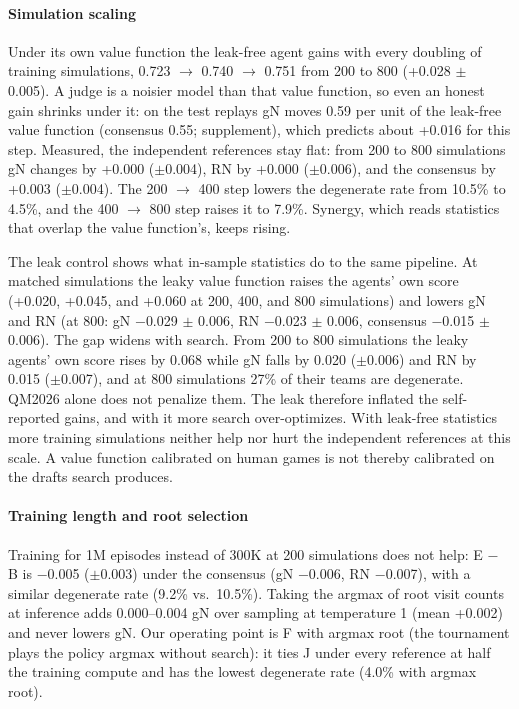 \documentclass[journal]{IEEEtran}
\begin{document}
\paragraph{Simulation scaling} Under its own value function the leak-free agent gains with every doubling of training simulations, 0.723 $\to$ 0.740 $\to$ 0.751 from 200 to 800 (+0.028 $\pm$ 0.005). A judge is a noisier model than that value function, so even an honest gain shrinks under it: on the test replays gN moves 0.59 per unit of the leak-free value function (consensus 0.55; supplement), which predicts about +0.016 for this step. Measured, the independent references stay flat: from 200 to 800 simulations gN changes by +0.000 ($\pm$0.004), RN by +0.000 ($\pm$0.006), and the consensus by +0.003 ($\pm$0.004). The 200 $\to$ 400 step lowers the degenerate rate from 10.5\% to 4.5\%, and the 400 $\to$ 800 step raises it to 7.9\%. Synergy, which reads statistics that overlap the value function's, keeps rising.

The leak control shows what in-sample statistics do to the same pipeline. At matched simulations the leaky value function raises the agents' own score (+0.020, +0.045, and +0.060 at 200, 400, and 800 simulations) and lowers gN and RN (at 800: gN $-$0.029 $\pm$ 0.006, RN $-$0.023 $\pm$ 0.006, consensus $-$0.015 $\pm$ 0.006). The gap widens with search. From 200 to 800 simulations the leaky agents' own score rises by 0.068 while gN falls by 0.020 ($\pm$0.006) and RN by 0.015 ($\pm$0.007), and at 800 simulations 27\% of their teams are degenerate. QM2026 alone does not penalize them. The leak therefore inflated the self-reported gains, and with it more search over-optimizes. With leak-free statistics more training simulations neither help nor hurt the independent references at this scale. A value function calibrated on human games is not thereby calibrated on the drafts search produces.

\paragraph{Training length and root selection} Training for 1M episodes instead of 300K at 200 simulations does not help: E $-$ B is $-$0.005 ($\pm$0.003) under the consensus (gN $-$0.006, RN $-$0.007), with a similar degenerate rate (9.2\% vs.\ 10.5\%). Taking the argmax of root visit counts at inference adds 0.000--0.004 gN over sampling at temperature 1 (mean +0.002) and never lowers gN. Our operating point is F with argmax root (the tournament plays the policy argmax without search): it ties J under every reference at half the training compute and has the lowest degenerate rate (4.0\% with argmax root).
\end{document}
